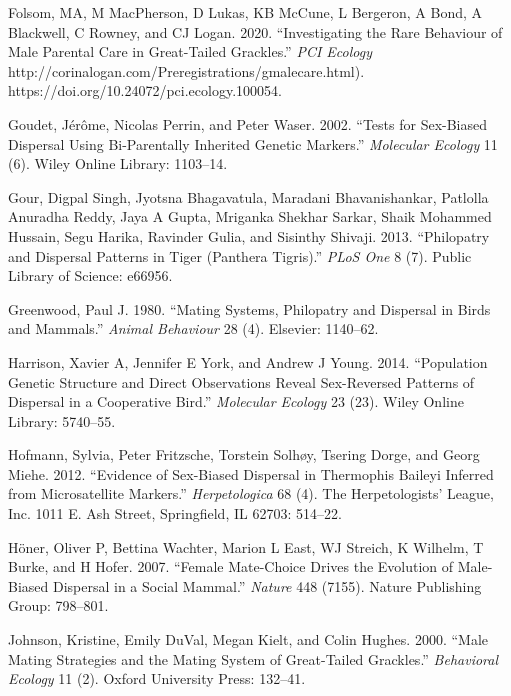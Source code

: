 \documentclass[]{article}
\begin{document}
\leavevmode\hypertarget{ref-Folsom2020malecare}{}%
Folsom, MA, M MacPherson, D Lukas, KB McCune, L Bergeron, A Bond, A
Blackwell, C Rowney, and CJ Logan. 2020. ``Investigating the Rare
Behaviour of Male Parental Care in Great-Tailed Grackles.'' \emph{PCI
Ecology} http://corinalogan.com/Preregistrations/gmalecare.html).
https://doi.org/10.24072/pci.ecology.100054.

\leavevmode\hypertarget{ref-goudet2002tests}{}%
Goudet, Jérôme, Nicolas Perrin, and Peter Waser. 2002. ``Tests for
Sex-Biased Dispersal Using Bi-Parentally Inherited Genetic Markers.''
\emph{Molecular Ecology} 11 (6). Wiley Online Library: 1103--14.

\leavevmode\hypertarget{ref-gour2013philopatry}{}%
Gour, Digpal Singh, Jyotsna Bhagavatula, Maradani Bhavanishankar,
Patlolla Anuradha Reddy, Jaya A Gupta, Mriganka Shekhar Sarkar, Shaik
Mohammed Hussain, Segu Harika, Ravinder Gulia, and Sisinthy Shivaji.
2013. ``Philopatry and Dispersal Patterns in Tiger (Panthera Tigris).''
\emph{PLoS One} 8 (7). Public Library of Science: e66956.

\leavevmode\hypertarget{ref-greenwood1980mating}{}%
Greenwood, Paul J. 1980. ``Mating Systems, Philopatry and Dispersal in
Birds and Mammals.'' \emph{Animal Behaviour} 28 (4). Elsevier: 1140--62.

\leavevmode\hypertarget{ref-harrison2014population}{}%
Harrison, Xavier A, Jennifer E York, and Andrew J Young. 2014.
``Population Genetic Structure and Direct Observations Reveal
Sex-Reversed Patterns of Dispersal in a Cooperative Bird.''
\emph{Molecular Ecology} 23 (23). Wiley Online Library: 5740--55.

\leavevmode\hypertarget{ref-hofmann2012evidence}{}%
Hofmann, Sylvia, Peter Fritzsche, Torstein Solhøy, Tsering Dorge, and
Georg Miehe. 2012. ``Evidence of Sex-Biased Dispersal in Thermophis
Baileyi Inferred from Microsatellite Markers.'' \emph{Herpetologica} 68
(4). The Herpetologists' League, Inc. 1011 E. Ash Street, Springfield,
IL 62703: 514--22.

\leavevmode\hypertarget{ref-honer2007female}{}%
Höner, Oliver P, Bettina Wachter, Marion L East, WJ Streich, K Wilhelm,
T Burke, and H Hofer. 2007. ``Female Mate-Choice Drives the Evolution of
Male-Biased Dispersal in a Social Mammal.'' \emph{Nature} 448 (7155).
Nature Publishing Group: 798--801.

\leavevmode\hypertarget{ref-johnson2000male}{}%
Johnson, Kristine, Emily DuVal, Megan Kielt, and Colin Hughes. 2000.
``Male Mating Strategies and the Mating System of Great-Tailed
Grackles.'' \emph{Behavioral Ecology} 11 (2). Oxford University Press:
132--41.
\end{document}
